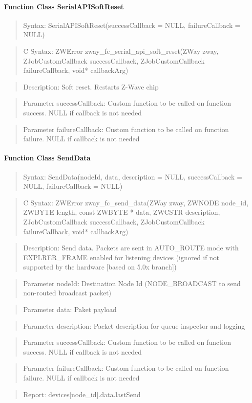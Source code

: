 \paragraph{Function Class SerialAPISoftReset}
\begin{quote}Syntax: SerialAPISoftReset(successCallback = NULL, failureCallback = NULL)\end{quote}
\begin{quote}C Syntax: ZWError zway\_fc\_serial\_api\_soft\_reset(ZWay zway, ZJobCustomCallback successCallback, ZJobCustomCallback failureCallback, void* callbackArg)\end{quote}
\begin{quote}Description: Soft reset. Restarts Z-Wave chip\end{quote}
\begin{quote}Parameter successCallback: Custom function to be called on function success. NULL if callback is not needed\end{quote}
\begin{quote}Parameter failureCallback: Custom function to be called on function failure. NULL if callback is not needed\end{quote}


\paragraph{Function Class SendData}
\begin{quote}Syntax: SendData(nodeId, data, description = NULL, successCallback = NULL, failureCallback = NULL)\end{quote}
\begin{quote}C Syntax: ZWError zway\_fc\_send\_data(ZWay zway, ZWNODE node\_id, ZWBYTE length, const ZWBYTE * data, ZWCSTR description, ZJobCustomCallback successCallback, ZJobCustomCallback failureCallback, void* callbackArg)\end{quote}
\begin{quote}Description: Send data. Packets are sent in AUTO\_ROUTE mode with EXPLRER\_FRAME enabled for listening devices (ignored if not supported by the hardware [based on 5.0x branch])\end{quote}
\begin{quote}Parameter nodeId: Destination Node Id (NODE\_BROADCAST to send non-routed broadcast packet)\end{quote}
\begin{quote}Parameter data: Paket payload\end{quote}
\begin{quote}Parameter description: Packet description for queue inspector and logging\end{quote}
\begin{quote}Parameter successCallback: Custom function to be called on function success. NULL if callback is not needed\end{quote}
\begin{quote}Parameter failureCallback: Custom function to be called on function failure. NULL if callback is not needed\end{quote}
\begin{quote}Report: devices[node\_id].data.lastSend\end{quote}

